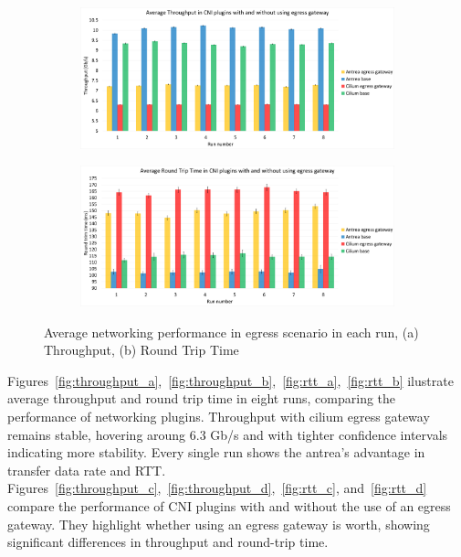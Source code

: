 \begin{figure}[H]
    \centering
    \begin{subfigure}[b]{0.7\textwidth}
        \includegraphics[width=\textwidth]{plots/egress/throughput_all.png}
        \caption{}
        \label{fig:throughput_all}
    \end{subfigure}
    \begin{subfigure}[b]{0.7\textwidth}
        \includegraphics[width=\textwidth]{plots/egress/rtt_all.png}
        \caption{}
        \label{fig:rtt_all}
    \end{subfigure}
    
    \caption{Average networking performance in egress scenario in each run, (a) Throughput, (b) Round Trip Time}
    \label{fig:networking_avg_all}
\end{figure}




Figures~\ref{fig:throughput_a},~\ref{fig:throughput_b},~\ref{fig:rtt_a},~\ref{fig:rtt_b} ilustrate average throughput and round trip time in eight runs, comparing the performance of networking plugins. Throughput with cilium egress gateway remains stable, hovering aroung 6.3 Gb/s and with tighter confidence intervals indicating more stability. Every single run shows the antrea's advantage in transfer data rate and RTT.
Figures~\ref{fig:throughput_c},~\ref{fig:throughput_d},~\ref{fig:rtt_c}, and~\ref{fig:rtt_d} compare the performance of CNI plugins with and without the use of an egress gateway. They highlight whether using an egress gateway is worth, showing significant differences in throughput and round-trip time.


